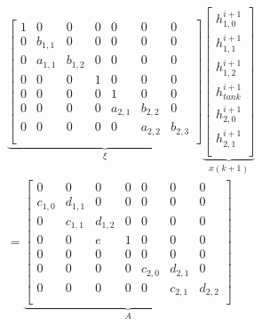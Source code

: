 \begin{equation}\label{eq:tank_linear_implement_ss}
\begin{aligned}
      & \underbrace{\begin{bmatrix}
            1 & 0       & 0         &0          &0          &0   &0\\
            0 & b_{1,1} & 0         &0          &0          &0  &0\\
            0 &a_{1,1}  & b_{1,2}   & 0         &0          &0 &0\\
            0 &0        & 0         & 1         & 0         &0      &0\\
             0 &0        & 0         &  0        & 1         &0   & 0        \\
            0 & 0       &0          &  0         &a_{2,1}    &  b_{2,2}&0       \\
            0 & 0       & 0         &   0        &     0      & a_{2,2}  & b_{2,3}\\  
       \end{bmatrix}}_{\xi}
        \underbrace{\begin{bmatrix}
        h_{1,0}^{i+1}\\
        h_{1,1}^{i+1} \\
        h_{1,2}^{i+1} \\ 
        h_{tank}^{i+1} \\          
        h_{2,0}^{i+1}     \\
        h_{2,1}^{i+1}\\
    \end{bmatrix}}_{x(k+1)}
    \\ &=
    \underbrace{\begin{bmatrix}
        0       &  0    &   0    & 0     &0         &0          &0 \\
        c_{1,0} &d_{1,1}&   0    &  0    &0         &0          &0\\
        0       &c_{1,1}& d_{1,2}& 0     &0         &0       &0\\
        0       & 0     & e    & 1     &0         &0          &0           \\
        0       & 0     &   0    & 0     & 0        &0          &0        \\
        0       & 0     &  0     & 0    &c_{2,0}    &  d_{2,1} &0  \\
         0       & 0     &  0    & 0    &0          &c_{2,1}    &  d_{2,2}   \\
        \end{bmatrix}}_{A}

\end{aligned}
\end{equation}
